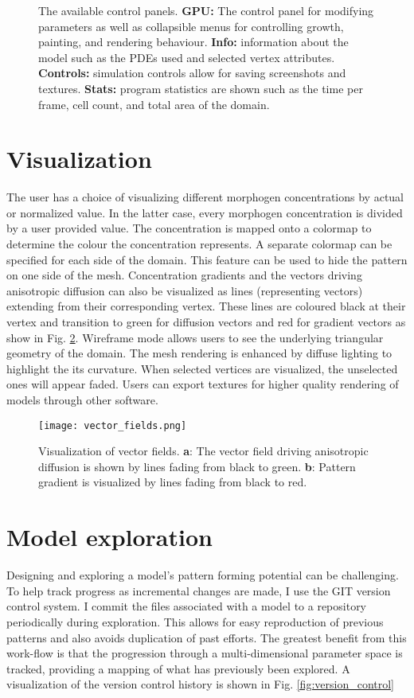 \begin{figure}[p]
	\centering
	\caption{The available control panels. \textbf{GPU:} The control panel for modifying parameters as well as collapsible menus for controlling growth, painting, and rendering behaviour. \textbf{Info:} information about the model such as the PDEs used and selected vertex attributes. \textbf{Controls:} simulation controls allow for saving screenshots and textures. \textbf{Stats:} program statistics are shown such as the time per frame, cell count, and total area of the domain.} 
	\label{fig:GUIexample}
\end{figure}


\section{Visualization}
The user has a choice of visualizing different morphogen concentrations by actual or normalized value. In the latter case, every morphogen concentration is divided by a user provided value. The concentration is mapped onto a colormap to determine the colour the concentration represents. A separate colormap can be specified for each side of the domain. This feature can be used to hide the pattern on one side of the mesh. Concentration gradients and the vectors driving anisotropic diffusion can also be visualized as lines (representing vectors) extending from their corresponding vertex. These lines are coloured black at their vertex and transition to green for diffusion vectors and red for gradient vectors as show in Fig. \ref{fig:vector_fields}. Wireframe mode allows users to see the underlying triangular geometry of the domain. The mesh rendering is enhanced by diffuse lighting to highlight the its curvature. When selected vertices are visualized, the unselected ones will appear faded. Users can export textures for higher quality rendering of models through other software.

\begin{figure}[ht]
	\centering
	\texttt{[image: vector\_fields.png]}	
	\caption{Visualization of vector fields. \textbf{a}: The vector field driving anisotropic diffusion is shown by lines fading from black to green. \textbf{b}: Pattern gradient is visualized by lines fading from black to red.} 
	\label{fig:vector_fields}
\end{figure}

\section{Model exploration}
Designing and exploring a model's pattern forming potential can be challenging. To help track progress as incremental changes are made, I use the GIT version control system. I commit the files associated with a model to a repository periodically during exploration. This allows for easy reproduction of previous patterns and also avoids duplication of past efforts. The greatest benefit from this work-flow is that the progression through a multi-dimensional parameter space is tracked, providing a mapping of what has previously been explored. A visualization of the version control history is shown in Fig. \ref{fig:version_control}

